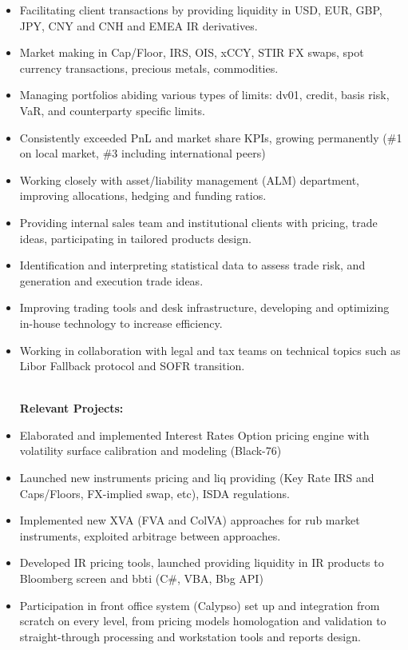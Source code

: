 \documentclass[letterpaper,hidelinks]{article}
\newcommand{\resumeItemRoutine}[1]{
  \item[\small\ding{223}]\small{
    {#1 \vspace{-2pt}}
  }
}
\newcommand{\resumeItemProject}[1]{
  \item[\small\ding{51}]\small{
    {#1 \vspace{-2pt}}
  }
}
\newcommand{\resumeItemListStart}{\begin{itemize}}
\newcommand{\resumeItemListEnd}{\end{itemize}\vspace{-5pt}}
\begin{document}
\vspace{1pt}
\resumeItemListStart
\resumeItemRoutine{Facilitating client transactions by providing liquidity in USD, EUR, GBP, JPY, CNY and CNH and EMEA IR derivatives.}
\resumeItemRoutine{Market making in Cap/Floor, IRS, OIS, xCCY, STIR FX swaps, spot currency transactions, precious metals, commodities.}
\resumeItemRoutine{Managing portfolios abiding various types of limits: dv01, credit, basis risk, VaR, and counterparty specific limits.}
\resumeItemRoutine{Consistently exceeded PnL and market share KPIs, growing permanently (\#1 on local market, \#3 including international peers)}
\resumeItemRoutine{Working closely with asset/liability management (ALM) department, improving allocations, hedging and funding ratios.}
\resumeItemRoutine{Providing internal sales team and institutional clients with pricing, trade ideas, participating in tailored products design.}
\resumeItemRoutine{Identification and interpreting statistical data to assess trade risk, and generation and execution trade ideas.}
\resumeItemRoutine{Improving trading tools and desk infrastructure, developing and optimizing in-house technology to increase efficiency.}
\resumeItemRoutine{Working in collaboration with legal and tax teams on technical topics such as Libor Fallback protocol and SOFR transition.}
\vspace{2pt}\\
\hspace{-13pt}\textbf{Relevant Projects:}
\vspace{-3pt}
\resumeItemProject{Elaborated and implemented Interest Rates Option pricing engine with volatility surface calibration and modeling (Black-76)}
\resumeItemProject{Launched new instruments pricing and liq providing (Key Rate IRS and Caps/Floors, FX-implied swap, etc), ISDA regulations.}
\resumeItemProject{Implemented new XVA (FVA and ColVA) approaches for rub market instruments, exploited arbitrage between approaches.}
\resumeItemProject{Developed IR pricing tools, launched providing liquidity in IR products to Bloomberg screen and bbti (C\#, VBA, Bbg API)}
\resumeItemProject{Participation in front office system (Calypso) set up and integration from scratch on every level, from pricing models homologation and validation to straight-through processing and workstation tools and reports design.}
\resumeItemListEnd
\end{document}
